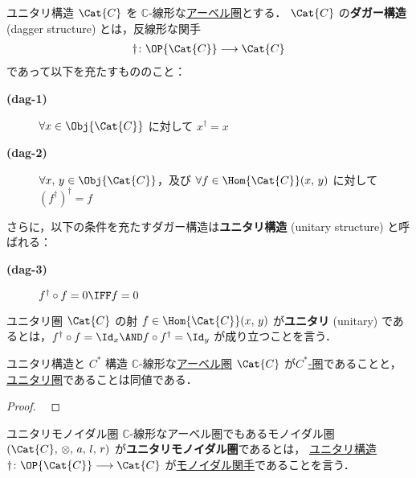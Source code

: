 \documentclass[TQFT_main]{subfiles}
\begin{document}
\begin{mydef}[label=def:unitary]{ユニタリ構造}
    $\Cat{C}$ を $\mathbb{C}$-線形な\hyperref[def:additive-cat]{アーベル圏}とする．
    $\Cat{C}$ の\textbf{ダガー構造} (dagger structure) とは，反線形な関手
    \begin{align}
        \dagger \colon \OP{\Cat{C}} \lto \Cat{C}
    \end{align}
    であって以下を充たすもののこと：
    \begin{description}
        \item[\textbf{(dag-1)}] $\forall x \in \Obj{\Cat{C}}$ に対して $x^\dagger = x$
        \item[\textbf{(dag-2)}] $\forall x,\, y \in \Obj{\Cat{C}}$，及び $\forall f \in \Hom{\Cat{C}}(x,\, y)$ に対して $(f^\dagger)^\dagger = f$
    \end{description}
    さらに，以下の条件を充たすダガー構造は\textbf{ユニタリ構造} (unitary structure) と呼ばれる：
    \begin{description}
        \item[\textbf{(dag-3)}] $f^\dagger \circ f = 0 \IFF f = 0$
    \end{description}
    
    \tcblower

    ユニタリ圏 $\Cat{C}$ の射 $f \in \Hom{\Cat{C}}(x,\, y)$ が\textbf{ユニタリ} (unitary) であるとは，$f^\dagger \circ f = \Id_x \AND f \circ f^\dagger = \Id_y$ が成り立つことを言う．
\end{mydef}

\begin{myprop}[label=prop:unitary-Cstar]{ユニタリ構造と $C^*$ 構造}
    $\mathbb{C}$-線形な\hyperref[def:additive-cat]{アーベル圏} $\Cat{C}$ が\hyperref[def:starcat]{$C^*$-圏}であることと，\hyperref[def:unitary]{ユニタリ圏}であることは同値である．
\end{myprop}

\begin{proof}
    ~\cite[Proposition 2.1, p.5]{Mueger1998}
\end{proof}

\begin{mydef}[label=def:unitary-monoidal]{ユニタリモノイダル圏}
    $\mathbb{C}$-線形なアーベル圏でもあるモノイダル圏 $(\Cat{C},\, \otimes ,\, a,\, l,\, r)$ が\textbf{ユニタリモノイダル圏}であるとは，
    \hyperref[def:unitary]{ユニタリ構造} $\dagger \colon \OP{\Cat{C}} \lto \Cat{C}$ が\hyperref[redef:monidal-functor]{モノイダル関手}であることを言う．
\end{mydef}
\end{document}
